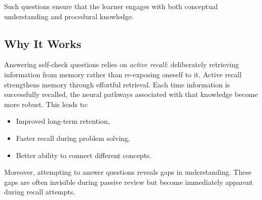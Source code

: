 \documentclass{article}
\begin{document}
Such questions ensure that the learner engages with both conceptual understanding and procedural knowledge.

\subsection{Why It Works}

Answering self-check questions relies on \emph{active recall}: deliberately retrieving information from memory rather than re-exposing oneself to it. Active recall strengthens memory through effortful retrieval. Each time information is successfully recalled, the neural pathways associated with that knowledge become more robust. This leads to:
\begin{itemize}
  \item Improved long-term retention,
  \item Faster recall during problem solving,
  \item Better ability to connect different concepts.
\end{itemize}

Moreover, attempting to answer questions reveals gaps in understanding. These gaps are often invisible during passive review but become immediately apparent during recall attempts.

\clearpage

\tableofcontents

\clearpage






\clearpage


\end{document}
